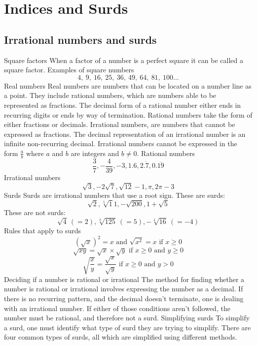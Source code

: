\section{Indices and Surds}
\begin{outline}

\0
\subsection{Irrational numbers and surds}
	\1 Square factors
		\2 When a factor of a number is a perfect square it can be called a square factor.
			\3 Examples of square numbers
				\[4,\ 9,\ 16,\ 25,\ 36,\ 49,\ 64,\ 81,\ 100\dots\]
	\1 Real numbers
		\2 Real numbers are numbers that can be located on a number line as a point. They include rational numbers, which are numbers able to be represented as fractions. The decimal form of a rational number either ends in recurring digits or ends by way of termination. Rational numbers take the form of either fractions or decimals. Irrational numbers, are numbers that cannot be expressed as fractions. The decimal representation of an irrational number is an infinite non-recurring decimal. Irrational numbers cannot be expressed in the form $\frac{a}{b}$ where $a$ and $b$ are integers and $b \ne 0$.
			\3 Rational numbers
				\[\frac{3}{7}, {-\frac{4}{39}}, -3, 1.6, 2.\dot7, 0.\overline{19}\]
			\3 Irrational numbers
				\[\sqrt{3}, {-2}\sqrt{7}, \sqrt{12} - 1, \pi, 2\pi - 3\]
	\1 Surds
		\2 Surds are irrational numbers that use a root sign.
			\3 These are surds:
				\[\sqrt{2}, \sqrt[5]11, {-\sqrt{200}}, 1 + \sqrt{5}\]
			\3 These are not surds:
				\[\sqrt{4}\ (=2), \sqrt[3]{125}\ (=5), -\sqrt[4]{16}\ (=-4)\]
	\1 Rules that apply to surds
		\[(\sqrt{x})^2 = x \text{\ and\ } \sqrt{x^2} = x \text{\ \ \ \ if\ \ \ \ } x \geq 0\]
		\[\sqrt{xy} = \sqrt{x} \times \sqrt{y} \text{\ \ \ \ if\ \ \ \ } x \geq 0 \text{\ and\ } y \geq 0\]
		\[\sqrt{\frac{x}{y}} = \frac{\sqrt{x}}{\sqrt{y}} \text{\ \ \ \ if\ \ \ \ } x \geq 0 \text{\ and\ } y > 0\]
	\1 Deciding if a number is rational or irrational
		\2 The method for finding whether a number is rational or irrational involves expressing the number as a decimal. If there is no recurring pattern, and the decimal doesn't terminate, one is dealing with an irrational number. If either of those conditions aren't followed, the number must be rational, and therefore not a surd.
	\1 Simplifying surds
		\2 To simplify a surd, one must identify what type of surd they are trying to simplify. There are four common types of surds, all which are simplified using different methods.

\end{outline}
